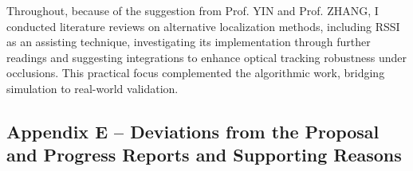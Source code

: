 \documentclass[11pt]{article}
\begin{document}
\begin{itemize}
        Throughout, because of the suggestion from Prof. YIN and Prof. ZHANG, I conducted literature reviews on alternative localization methods, including RSSI as an assisting technique, investigating its implementation through further readings and suggesting integrations to enhance optical tracking robustness under occlusions. This practical focus complemented the algorithmic work, bridging simulation to real-world validation.
    \end{itemize}

    \newpage
    \subsection*{Appendix E -- Deviations from the Proposal and Progress Reports and Supporting Reasons}
\end{document}
